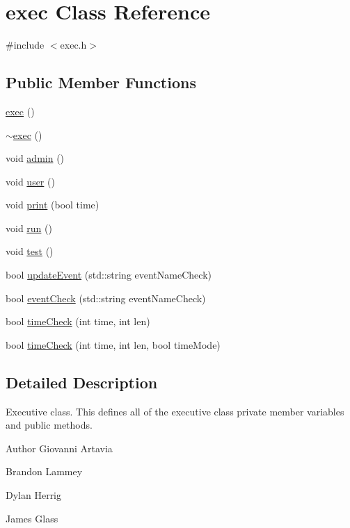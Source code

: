 \hypertarget{classexec}{}\section{exec Class Reference}
\label{classexec}


{\ttfamily \#include $<$exec.\+h$>$}

\subsection*{Public Member Functions}
\begin{DoxyCompactItemize}
\item 
\hyperlink{classexec_a2fac94db8f997a01a590c01478662339}{exec} ()
\item 
\hyperlink{classexec_a663a64f17c5431dc01a829f5633e4f56}{$\sim$exec} ()
\item 
void \hyperlink{classexec_a9d632d01c033f970fb246864bff38b60}{admin} ()
\item 
void \hyperlink{classexec_a924407f4d277807e949aa9e97470f536}{user} ()
\item 
void \hyperlink{classexec_a4cf771a565711689023aa75141f82c52}{print} (bool time)
\item 
void \hyperlink{classexec_aad3ea9a2cd99fc28471062719b85b1f6}{run} ()
\item 
void \hyperlink{classexec_af6f7f6a6d2e09aa2d2616dddb58af53a}{test} ()
\item 
bool \hyperlink{classexec_a1d2075b76a47a05795d8ac9d6fb24cbe}{update\+Event} (std\+::string event\+Name\+Check)
\item 
bool \hyperlink{classexec_abf1c735a300deae3f5de4bf6891f2190}{event\+Check} (std\+::string event\+Name\+Check)
\item 
bool \hyperlink{classexec_a7e711b54128bd8ff8039886ce4ce6fb3}{time\+Check} (int time, int len)
\item 
bool \hyperlink{classexec_afc82b1343e127d9a7bdc36f050bdf605}{time\+Check} (int time, int len, bool time\+Mode)
\end{DoxyCompactItemize}


\subsection{Detailed Description}
Executive class. This defines all of the executive class\textquotesingle{} private member variables and public methods. \begin{DoxyAuthor}{Author}
Giovanni Artavia 

Brandon Lammey 

Dylan Herrig 

James Glass 
\end{DoxyAuthor}


